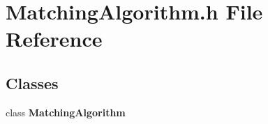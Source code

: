 \section{Matching\+Algorithm.\+h File Reference}
\label{MatchingAlgorithm_8h}
\subsection*{Classes}
\begin{DoxyCompactItemize}
\item 
class \textbf{ Matching\+Algorithm}
\end{DoxyCompactItemize}
